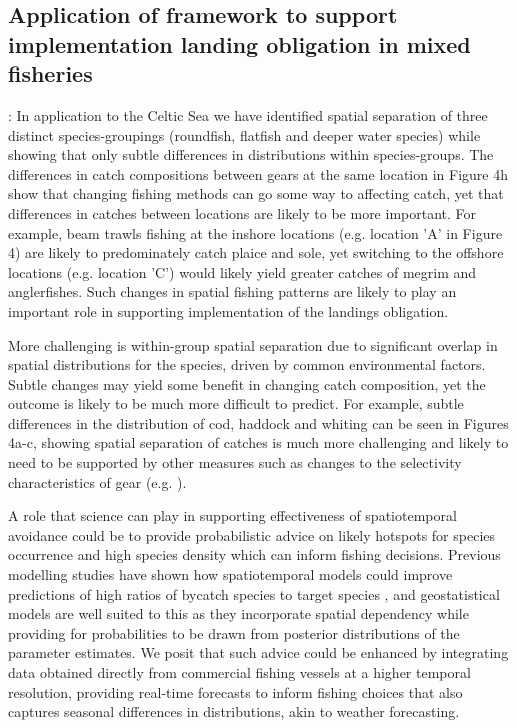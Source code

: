 \documentclass{nature}
\begin{document}
\begin{linenumbers}
\subsection{Application of framework to support implementation landing
	obligation in mixed fisheries}: In application to the Celtic Sea we have
identified spatial separation of three distinct species-groupings (roundfish,
flatfish and deeper water species) while showing that only subtle differences
in distributions within species-groups. The differences in catch compositions
between gears at the same location in Figure 4h show that changing fishing
methods can go some way to affecting catch, yet that differences in catches
between locations are likely to be more important. For example, beam trawls
fishing at the inshore locations (e.g. location 'A' in Figure 4) are likely to
predominately catch plaice and sole, yet switching to the offshore locations
(e.g. location 'C') would likely yield greater catches of megrim and
anglerfishes.  Such changes in spatial fishing patterns are likely to play an
important role in supporting implementation of the landings obligation.

More challenging is within-group spatial separation due to significant overlap
in spatial distributions for the species, driven by common environmental
factors. Subtle changes may yield some benefit in changing catch composition,
yet the outcome is likely to be much more difficult to predict. For example,
subtle differences in the distribution of cod, haddock and whiting can be seen
in Figures 4a-c, showing spatial separation of catches is much more challenging
and likely to need to be supported by other measures such as changes to the
selectivity characteristics of gear (e.g. \cite{Santos2016}). 

A role that science can play in supporting effectiveness of spatiotemporal
avoidance could be to provide probabilistic advice on likely hotspots for
species occurrence and high species density which can inform fishing decisions.
Previous modelling studies have shown how spatiotemporal models could improve
predictions of high ratios of bycatch species to target species \cite{Ward2015,
	Cosandey-Godin2015, Breivik2016}, and geostatistical models are well
suited to this as they incorporate spatial dependency while providing for
probabilities to be drawn from posterior distributions of the parameter
estimates.  We posit that such advice could be enhanced by integrating data
obtained directly from commercial fishing vessels at a higher temporal
resolution, providing real-time forecasts to inform fishing choices that also
captures seasonal differences in distributions, akin to weather forecasting.


\end{linenumbers}
\end{document}
